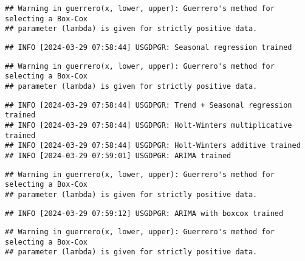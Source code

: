 \documentclass[
]{article}
\begin{document}
\begin{verbatim}
## Warning in guerrero(x, lower, upper): Guerrero's method for selecting a Box-Cox
## parameter (lambda) is given for strictly positive data.
\end{verbatim}

\begin{verbatim}
## INFO [2024-03-29 07:58:44] USGDPGR: Seasonal regression trained
\end{verbatim}

\begin{verbatim}
## Warning in guerrero(x, lower, upper): Guerrero's method for selecting a Box-Cox
## parameter (lambda) is given for strictly positive data.
\end{verbatim}

\begin{verbatim}
## INFO [2024-03-29 07:58:44] USGDPGR: Trend + Seasonal regression trained
## INFO [2024-03-29 07:58:44] USGDPGR: Holt-Winters multiplicative trained
## INFO [2024-03-29 07:58:44] USGDPGR: Holt-Winters additive trained
## INFO [2024-03-29 07:59:01] USGDPGR: ARIMA trained
\end{verbatim}

\begin{verbatim}
## Warning in guerrero(x, lower, upper): Guerrero's method for selecting a Box-Cox
## parameter (lambda) is given for strictly positive data.
\end{verbatim}

\begin{verbatim}
## INFO [2024-03-29 07:59:12] USGDPGR: ARIMA with boxcox trained
\end{verbatim}

\begin{verbatim}
## Warning in guerrero(x, lower, upper): Guerrero's method for selecting a Box-Cox
## parameter (lambda) is given for strictly positive data.
\end{verbatim}
\end{document}
